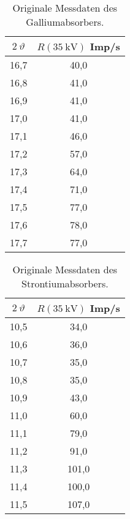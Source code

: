 \begin{table}[H]
    \caption{Originale Messdaten des Galliumabsorbers.}
    \centering
    \label{tab:origDaten3}
    \begin{tabular}{c c}
        \toprule
        $2~\vartheta$ & $R(\SI{35}{\kilo\volt})$ Imp/s \\
        \midrule
        16,7  &  40,0  \\
        16,8  &  41,0  \\
        16,9  &  41,0  \\
        17,0  &  41,0  \\
        17,1  &  46,0  \\
        17,2  &  57,0  \\
        17,3  &  64,0  \\
        17,4  &  71,0  \\
        17,5  &  77,0  \\
        17,6  &  78,0  \\
        17,7  &  77,0  \\
        \bottomrule
    \end{tabular}
\end{table}

\begin{table}[H]
    \caption{Originale Messdaten des Strontiumabsorbers.}
    \centering
    \label{tab:origDaten4}
    \begin{tabular}{c c}
        \toprule
        $2~\vartheta$ & $R(\SI{35}{\kilo\volt})$ Imp/s \\
        \midrule
        10,5  &  34,0  \\
        10,6  &  36,0  \\
        10,7  &  35,0  \\
        10,8  &  35,0  \\
        10,9  &  43,0  \\
        11,0  &  60,0  \\
        11,1  &  79,0  \\
        11,2  &  91,0  \\
        11,3  &  101,0  \\
        11,4  &  100,0  \\
        11,5  &  107,0  \\
    \end{tabular}
\end{table}


